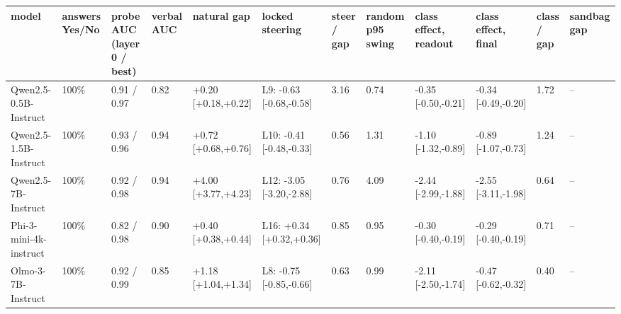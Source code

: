 \begin{tabular}{llllllllllll}
\toprule
model & answers Yes/No & probe AUC (layer 0 / best) & verbal AUC & natural gap & locked steering & steer / gap & random p95 swing & class effect, readout & class effect, final & class / gap & sandbag gap \\
\midrule
Qwen2.5-0.5B-Instruct & 100\% & 0.91 / 0.97 & 0.82 & +0.20 [+0.18,+0.22] & L9: -0.63 [-0.68,-0.58] & 3.16 & 0.74 & -0.35 [-0.50,-0.21] & -0.34 [-0.49,-0.20] & 1.72 & -- \\
Qwen2.5-1.5B-Instruct & 100\% & 0.93 / 0.96 & 0.94 & +0.72 [+0.68,+0.76] & L10: -0.41 [-0.48,-0.33] & 0.56 & 1.31 & -1.10 [-1.32,-0.89] & -0.89 [-1.07,-0.73] & 1.24 & -- \\
Qwen2.5-7B-Instruct & 100\% & 0.92 / 0.98 & 0.94 & +4.00 [+3.77,+4.23] & L12: -3.05 [-3.20,-2.88] & 0.76 & 4.09 & -2.44 [-2.99,-1.88] & -2.55 [-3.11,-1.98] & 0.64 & -- \\
Phi-3-mini-4k-instruct & 100\% & 0.82 / 0.98 & 0.90 & +0.40 [+0.38,+0.44] & L16: +0.34 [+0.32,+0.36] & 0.85 & 0.95 & -0.30 [-0.40,-0.19] & -0.29 [-0.40,-0.19] & 0.71 & -- \\
Olmo-3-7B-Instruct & 100\% & 0.92 / 0.99 & 0.85 & +1.18 [+1.04,+1.34] & L8: -0.75 [-0.85,-0.66] & 0.63 & 0.99 & -2.11 [-2.50,-1.74] & -0.47 [-0.62,-0.32] & 0.40 & -- \\
\bottomrule
\end{tabular}
